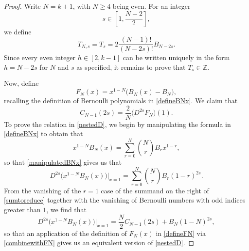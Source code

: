 \documentclass[12pt]{article}
\begin{document}
\begin{proof}
 Write $N = k + 1$, with $N \geq 4$ being even. For an integer 
\begin{equation}\label{srange} 
 s \in \left[ 1, \frac{N-2}{2} \right], 
\end{equation}
 we define
\begin{equation}\label{defineTs}
 T_{N, s} = T_{s} = 2 \frac{(N-1)!}{(N-2s)!} B_{N-2s}. 
\end{equation}
 Since every even integer $h \in [2, k-1]$ can be written uniquely in the form
 $h = N - 2s$ for $N$ and $s$ as specified, 
 it remains to prove that $T_{s} \in \mathbb{Z}$. 

 Now, define 
\begin{equation}\label{defineFN}
 F_{N}(x) = x^{1-N} \big( B_{N}(x) - B_{N} \big), 
\end{equation}
 recalling the definition of Bernoulli polynomials in \eqref{defineBNx}. We claim that 
\begin{equation}\label{nestedD}
 C_{N - 1}(2s) = \frac{2}{N} \big( D^{2s} F_{N} \big)(1). 
\end{equation}
 To prove the relation in \eqref{nestedD}, we begin by manipulating the formula in 
 \eqref{defineBNx} to obtain that 
\begin{equation}\label{manipulatedBNx} 
 x^{1-N} B_{N}(x) = \sum_{r=0}^{N} \binom{N}{r} B_{r} x^{1-r},
\end{equation}
 so that \eqref{manipulatedBNx} gives us that 
\begin{equation}\label{sumtoreduce} 
 D^{2s}\big( x^{1-N} B_{N}(x) \big) \Big|_{x=1}
 = \sum_{r=0}^{N} \binom{N}{r} B_{r}(1-r)^{2s}. 
\end{equation}
 From the vanishing of the $r = 1$ case of the summand on the right of \eqref{sumtoreduce} together with the vanishing of Bernoulli 
 numbers with odd indices greater than $1$, we find that 
\begin{equation}\label{combinewithFN} 
 D^{2s}\big( x^{1-N} B_{N}(x) \big) \Big|_{x=1}
 = \frac{N}{2} C_{N-1}(2s) + B_{N}(1-N)^{2s}, 
\end{equation}
 so that an application of the definition of $F_{N}(x)$ in \eqref{defineFN}
 via \eqref{combinewithFN} gives us an equivalent version of \eqref{nestedD}. 


\end{proof}
\end{document}
